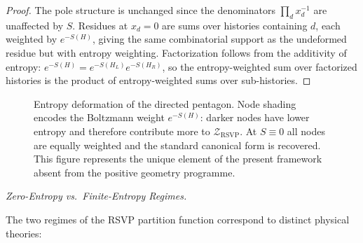 \documentclass[11pt]{article}
\theoremstyle{plain}
\theoremstyle{definition}
\theoremstyle{remark}
\newcommand{\Sf}{S}
\newcommand{\ZRSVP}{\mathcal{Z}_{\mathrm{RSVP}}}
\begin{document}
\begin{proof}
The pole structure is unchanged since the denominators $\prod_d x_d^{-1}$ are unaffected by $\Sf$. Residues at $x_d = 0$ are sums over histories containing $d$, each weighted by $e^{-\Sf(H)}$, giving the same combinatorial support as the undeformed residue but with entropy weighting. Factorization follows from the additivity of entropy: $e^{-\Sf(H)} = e^{-\Sf(H_L)} e^{-\Sf(H_R)}$, so the entropy-weighted sum over factorized histories is the product of entropy-weighted sums over sub-histories.
\end{proof}


\begin{figure}[H]
\centering
{}
\caption{Entropy deformation of the directed pentagon. Node shading
encodes the Boltzmann weight $e^{-\Sf(H)}$: darker nodes have lower
entropy and therefore contribute more to $\ZRSVP$. At $\Sf\equiv 0$
all nodes are equally weighted and the standard canonical form is
recovered. This figure represents the unique element of the present
framework absent from the positive geometry programme.}
\end{figure}

\medskip\noindent\textit{Zero-Entropy vs.\ Finite-Entropy Regimes.}

The two regimes of the RSVP partition function correspond to distinct physical theories:
\end{document}
